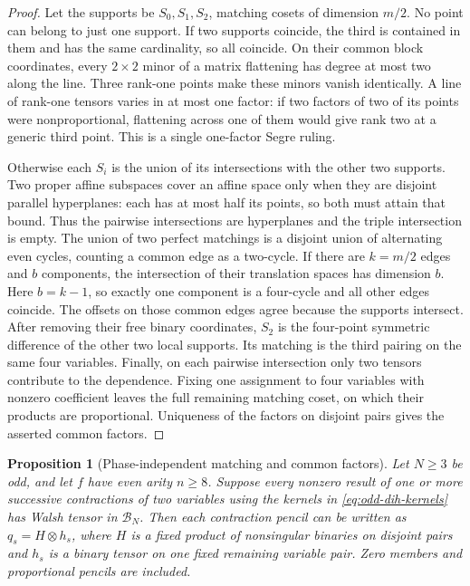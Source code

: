 \documentclass[11pt,letterpaper,onecolumn]{article}
\theoremstyle{plain}
\newtheorem{proposition}[proposition]{Proposition}
\theoremstyle{definition}
\theoremstyle{remark}
\begin{document}
	\begin{proof}
		Let the supports be \(S_0,S_1,S_2\), matching cosets of dimension \(m/2\).
		No point can belong to just one support.  If two supports coincide, the
		third is contained in them and has the same cardinality, so all coincide.
		On their common block coordinates, every \(2\times2\) minor of a matrix flattening has degree at
		most two along the line.  Three rank-one points make these minors vanish
		identically.  A line of rank-one tensors varies in at most one factor: if
		two factors of two of its points were nonproportional, flattening across
		one of them would give rank two at a generic third point.  This is a single one-factor Segre ruling.
		
		Otherwise each \(S_i\) is the union of its intersections with the other
		two supports.  Two proper affine subspaces cover an affine space only when
		they are disjoint parallel hyperplanes: each has at most half its points,
		so both must attain that bound.  Thus the pairwise intersections are
		hyperplanes and the triple intersection is empty.  The union of two
		perfect matchings is a disjoint union of alternating even cycles, counting
		a common edge as a two-cycle.  If there are \(k=m/2\) edges and \(b\)
		components, the intersection of their translation spaces has dimension \(b\).  Here
		\(b=k-1\), so exactly one component is a four-cycle and all other edges
		coincide.  The offsets on those common edges agree because the supports
		intersect.  After removing their free binary coordinates, \(S_2\) is the
		four-point symmetric difference of the other two local supports. Its
		matching is the third pairing on the same four variables.  Finally, on each
		pairwise intersection only two tensors contribute to the dependence.
		Fixing one assignment to four variables with nonzero coefficient leaves the full remaining matching coset, on which their products are proportional.  Uniqueness of the factors
		on disjoint pairs gives the asserted common factors.
	\end{proof}
	
	\begin{proposition}[Phase-independent matching and common factors]
		\label{prop:odd-dih-support-circuit-rigidity}
		Let \(N\ge3\) be odd, and let \(f\) have even arity \(n\ge8\).  Suppose
		every nonzero result of one or more successive contractions of two variables using
		the kernels in
		\cref{eq:odd-dih-kernels} has Walsh tensor in \(\mathcal B_N\).  Then each
		contraction pencil can be written as \(q_s=H\otimes h_s\), where \(H\)
		is a fixed product of nonsingular binaries on disjoint pairs and \(h_s\)
		is a binary tensor on one fixed remaining variable pair.  Zero members and proportional
		pencils are included.
	\end{proposition}
	
\end{document}
